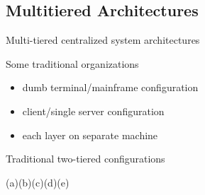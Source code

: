 \subsection{Multitiered Architectures}
\begin{slide}{Multi-tiered centralized system architectures}
  \begin{block}{Some traditional organizations}
    \begin{itemize}\tightlist
    \item {} dumb terminal/mainframe configuration
    \item {} client/single server configuration
    \item {} each layer on separate machine
    \end{itemize}
  \end{block}
  \begin{block}{Traditional two-tiered configurations}
    \newcommand{\ispace}{\hspace*{1.8cm}}
    \begin{center}
       \newline
      (a)\ispace(b)\ispace(c)\ispace(d)\ispace(e)
    \end{center}
  \end{block}
\end{slide}
